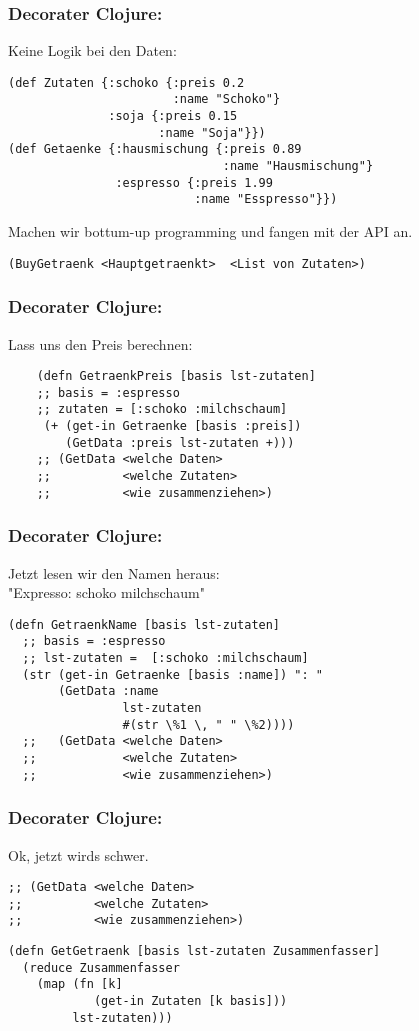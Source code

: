 \documentclass[compress, blue]{beamer}
\begin{document}
\begin{frame}[fragile]\frametitle{Decorater Clojure:}
  Keine Logik bei den Daten:
 \begin{lstlisting}
(def Zutaten {:schoko {:preis 0.2
                       :name "Schoko"}
              :soja {:preis 0.15 
                     :name "Soja"}})
(def Getaenke {:hausmischung {:preis 0.89 
                              :name "Hausmischung"}
               :espresso {:preis 1.99 
                          :name "Esspresso"}})
 \end{lstlisting}
\pause

Machen wir bottum-up programming und fangen mit der API an.
\pause
\begin{lstlisting}
(BuyGetraenk <Hauptgetraenkt>  <List von Zutaten>)
\end{lstlisting}
\pause
\end{frame}

\begin{frame}[fragile]\frametitle{Decorater Clojure:}
Lass uns den Preis berechnen:
\pause
  \begin{lstlisting}
    (defn GetraenkPreis [basis lst-zutaten]
    ;; basis = :espresso
    ;; zutaten = [:schoko :milchschaum]
     (+ (get-in Getraenke [basis :preis])
        (GetData :preis lst-zutaten +)))
    ;; (GetData <welche Daten> 
    ;;          <welche Zutaten> 
    ;;          <wie zusammenziehen>)
  \end{lstlisting}

\end{frame}

\begin{frame}[fragile]\frametitle{Decorater Clojure:}

Jetzt lesen wir den Namen heraus: \\
"Expresso: schoko milchschaum"
\pause
  \begin{lstlisting}
(defn GetraenkName [basis lst-zutaten]
  ;; basis = :espresso
  ;; lst-zutaten =  [:schoko :milchschaum]
  (str (get-in Getraenke [basis :name]) ": "
       (GetData :name 
                lst-zutaten 
                #(str \%1 \, " " \%2))))
  ;;   (GetData <welche Daten> 
  ;;            <welche Zutaten>
  ;;            <wie zusammenziehen>)
  \end{lstlisting}

\end{frame}

\begin{frame}[fragile]\frametitle{Decorater Clojure:}
  Ok, jetzt wirds schwer.

\begin{lstlisting}
;; (GetData <welche Daten> 
;;          <welche Zutaten> 
;;          <wie zusammenziehen>)
\end{lstlisting}
\begin{lstlisting}
(defn GetGetraenk [basis lst-zutaten Zusammenfasser]
  (reduce Zusammenfasser 
    (map (fn [k] 
            (get-in Zutaten [k basis])) 
         lst-zutaten)))  
\end{lstlisting}

\end{frame}
\end{document}
